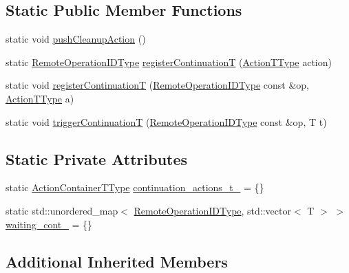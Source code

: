 \subsection*{Static Public Member Functions}
\begin{DoxyCompactItemize}
\item 
static void \hyperlink{structvt_1_1group_1_1_group_manager_t_ad149f3bfcb76761f22283a1bf6b147d0}{push\+Cleanup\+Action} ()
\item 
static \hyperlink{namespacevt_1_1group_a73f2624ddeb535b39a08b6524f26b244}{Remote\+Operation\+I\+D\+Type} \hyperlink{structvt_1_1group_1_1_group_manager_t_aa52eafbcdd4d1e8da4f17ef4cd03098a}{register\+ContinuationT} (\hyperlink{structvt_1_1group_1_1_group_manager_t_acb20922687d3165d97de391fdbaf02ca}{Action\+T\+Type} action)
\item 
static void \hyperlink{structvt_1_1group_1_1_group_manager_t_a0c366044c727d883691f89550c9706cd}{register\+ContinuationT} (\hyperlink{namespacevt_1_1group_a73f2624ddeb535b39a08b6524f26b244}{Remote\+Operation\+I\+D\+Type} const \&op, \hyperlink{structvt_1_1group_1_1_group_manager_t_acb20922687d3165d97de391fdbaf02ca}{Action\+T\+Type} a)
\item 
static void \hyperlink{structvt_1_1group_1_1_group_manager_t_a654b43bfc4360ba5c7f4a1680378bdad}{trigger\+ContinuationT} (\hyperlink{namespacevt_1_1group_a73f2624ddeb535b39a08b6524f26b244}{Remote\+Operation\+I\+D\+Type} const \&op, T t)
\end{DoxyCompactItemize}
\subsection*{Static Private Attributes}
\begin{DoxyCompactItemize}
\item 
static \hyperlink{structvt_1_1group_1_1_group_manager_t_adc0d6d680c4f8bdbb80cd90f84a5f7ee}{Action\+Container\+T\+Type} \hyperlink{structvt_1_1group_1_1_group_manager_t_ace6828eddb4d595c12ea5c07047207d6}{continuation\+\_\+actions\+\_\+t\+\_\+} = \{\}
\item 
static std\+::unordered\+\_\+map$<$ \hyperlink{namespacevt_1_1group_a73f2624ddeb535b39a08b6524f26b244}{Remote\+Operation\+I\+D\+Type}, std\+::vector$<$ T $>$ $>$ \hyperlink{structvt_1_1group_1_1_group_manager_t_a294adcb4f4b41892733f29b9dea70f9e}{waiting\+\_\+cont\+\_\+} = \{\}
\end{DoxyCompactItemize}
\subsection*{Additional Inherited Members}


